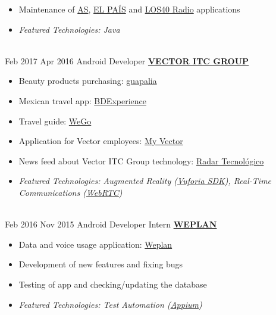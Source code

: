 \documentclass[letterpaper]{twentysecondcv} %
\begin{document}
\begin{twenty}
{{\begin{itemize}
        \item Maintenance of \href{https://play.google.com/store/apps/details?id=es.mmip.prisacom.as}{AS}, \href{https://play.google.com/store/apps/details?id=com.elpais.elpais}{EL PAÍS} and \href{https://play.google.com/store/apps/details?id=com.prisaradio.replicapp.loscuarenta}{LOS40 Radio} applications
        \item \textit{Featured Technologies: Java} 
    \end{itemize}}
        }
    \\   
    \twentyitem
   		{Feb 2017}
		{Apr 2016}
        {Android Developer}
        {\href{http://www.vectoritcgroup.com/es/home/global}{\textbf{VECTOR ITC GROUP}}}
        {}
        {
        {\begin{itemize}
        \item Beauty products purchasing: \href{https://play.google.com/store/apps/details?id=com.guapalia&hl=es}{guapalia}
        \item Mexican travel app: \href{https://play.google.com/store/apps/details?id=com.bdtravel.re_appbdtravelandroid&hl=es}{BDExperience}
        \item Travel guide: \href{https://play.google.com/store/apps/details?id=com.wego.bcn&hl=es}{WeGo}
        \item Application for Vector employees:
		\href{https://play.google.com/store/apps/details?id=com.vectormobile.myvector&hl=es}{My Vector}
		\item News feed about Vector ITC Group technology:
		\href{https://play.google.com/store/apps/details?id=com.vectormobile.trends&hl=es}{Radar Tecnológico}
		\item \textit{Featured Technologies: {Augmented Reality (\href{https://www.vuforia.com/}{Vuforia SDK})}, Real-Time Communications (\href{https://webrtc.org/}{WebRTC})}
    \end{itemize}}
        }
     \\
     \twentyitem
   		{Feb 2016}
		{Nov 2015}
        {Android Developer Intern}
        {\href{http://weplan-app.com/}{\textbf{WEPLAN}}}
        {}
        {
        \begin{itemize}
        \item Data and voice usage application: \href{https://play.google.com/store/apps/details?id=com.cumberland.tutarifa&hl=en}{Weplan}
        \item Development of new features and fixing bugs
        \item Testing of app and checking/updating the database
        \item \textit{Featured Technologies: Test Automation (\href{https://play.google.com/store/apps/details?id=com.cumberland.tutarifa&hl=en}{Appium})} 
    \end{itemize}
    	}
        
\end{twenty}
\end{document}
